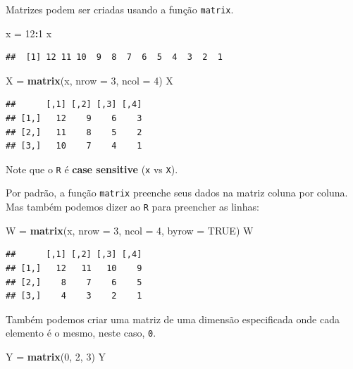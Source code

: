 \documentclass[
]{book}
\newenvironment{Shaded}{\begin{snugshade}}{\end{snugshade}}
\newcommand{\DataTypeTok}[1]{\textcolor[rgb]{0.13,0.29,0.53}{#1}}
\newcommand{\DecValTok}[1]{\textcolor[rgb]{0.00,0.00,0.81}{#1}}
\newcommand{\KeywordTok}[1]{\textcolor[rgb]{0.13,0.29,0.53}{\textbf{#1}}}
\newcommand{\NormalTok}[1]{#1}
\newcommand{\OperatorTok}[1]{\textcolor[rgb]{0.81,0.36,0.00}{\textbf{#1}}}
\newcommand{\OtherTok}[1]{\textcolor[rgb]{0.56,0.35,0.01}{#1}}
\newcommand{\StringTok}[1]{\textcolor[rgb]{0.31,0.60,0.02}{#1}}
\theoremstyle{definition}
\theoremstyle{definition}
\theoremstyle{definition}
\theoremstyle{remark}
\begin{document}
Matrizes podem ser criadas usando a função \texttt{matrix}.

\begin{Shaded}
\begin{Highlighting}[]
\NormalTok{x =}\StringTok{ }\DecValTok{12}\OperatorTok{:}\DecValTok{1}
\NormalTok{x}
\end{Highlighting}
\end{Shaded}

\begin{verbatim}
##  [1] 12 11 10  9  8  7  6  5  4  3  2  1
\end{verbatim}

\begin{Shaded}
\begin{Highlighting}[]
\NormalTok{X =}\StringTok{ }\KeywordTok{matrix}\NormalTok{(x, }\DataTypeTok{nrow =} \DecValTok{3}\NormalTok{, }\DataTypeTok{ncol =} \DecValTok{4}\NormalTok{)}
\NormalTok{X}
\end{Highlighting}
\end{Shaded}

\begin{verbatim}
##      [,1] [,2] [,3] [,4]
## [1,]   12    9    6    3
## [2,]   11    8    5    2
## [3,]   10    7    4    1
\end{verbatim}

Note que o \texttt{R} é \textbf{case sensitive} (\texttt{x} vs \texttt{X}).

Por padrão, a função \texttt{matrix} preenche seus dados na matriz coluna por coluna. Mas também podemos dizer ao \texttt{R} para preencher as linhas:

\begin{Shaded}
\begin{Highlighting}[]
\NormalTok{W =}\StringTok{ }\KeywordTok{matrix}\NormalTok{(x, }\DataTypeTok{nrow =} \DecValTok{3}\NormalTok{, }\DataTypeTok{ncol =} \DecValTok{4}\NormalTok{, }\DataTypeTok{byrow =} \OtherTok{TRUE}\NormalTok{)}
\NormalTok{W}
\end{Highlighting}
\end{Shaded}

\begin{verbatim}
##      [,1] [,2] [,3] [,4]
## [1,]   12   11   10    9
## [2,]    8    7    6    5
## [3,]    4    3    2    1
\end{verbatim}

Também podemos criar uma matriz de uma dimensão especificada onde cada elemento é o mesmo, neste caso, \texttt{0}.

\begin{Shaded}
\begin{Highlighting}[]
\NormalTok{Y =}\StringTok{ }\KeywordTok{matrix}\NormalTok{(}\DecValTok{0}\NormalTok{, }\DecValTok{2}\NormalTok{, }\DecValTok{3}\NormalTok{)}
\NormalTok{Y}
\end{Highlighting}
\end{Shaded}
\end{document}
